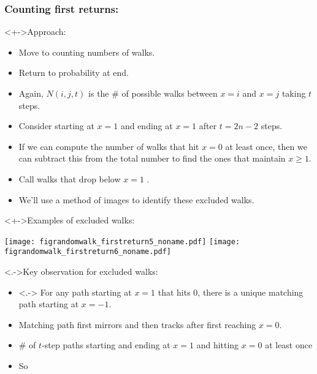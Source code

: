 \begin{frame}
  \frametitle{Counting first returns:}

  \begin{block}<+->{Approach:}
    \begin{itemize}
    \item<+->
      Move to counting numbers of walks.
    \item<+->
      Return to probability at end.
    \item<+->
      Again,
      $N(i,j,t)$ is the \# of possible walks between $x=i$ and $x=j$ taking $t$ steps.
    \item<+-> 
      Consider  starting at $x=1$ and ending at $x=1$ after $t=2n-2$ steps.
    \item<+-> 
       If we can compute the number of walks that hit $x=0$ at least once, then we can
      subtract this from the total number to find the ones that maintain $x \ge 1$.
    \item<+-> 
      Call walks that drop below $x=1$ .
    \item<+-> 
      We'll use a method of images to identify these excluded walks.
    \end{itemize}
  \end{block}

\end{frame}

\begin{frame}

  \begin{block}<+->{Examples of excluded walks:}
    \begin{center}
      \texttt{[image: figrandomwalk\_firstreturn5\_noname.pdf]}
      \texttt{[image: figrandomwalk\_firstreturn6\_noname.pdf]}
    \end{center}
  \end{block}

    \begin{block}<.->{Key observation for excluded walks:}
      \begin{itemize}
      \item<.->  
        For any path starting at $x$$=$$1$ that hits 0,
        there is a unique matching path starting at $x$$=$$-1$.
      \item<+->   
        Matching path first mirrors and then tracks after first reaching $x$$=$$0$.
      \item<+->
        \# of $t$-step paths starting and ending at $x$$=$$1$
        and hitting $x$$=$$0$ at least once\\
      \item<+->
        So 
      \end{itemize}
    \end{block}

\end{frame}



